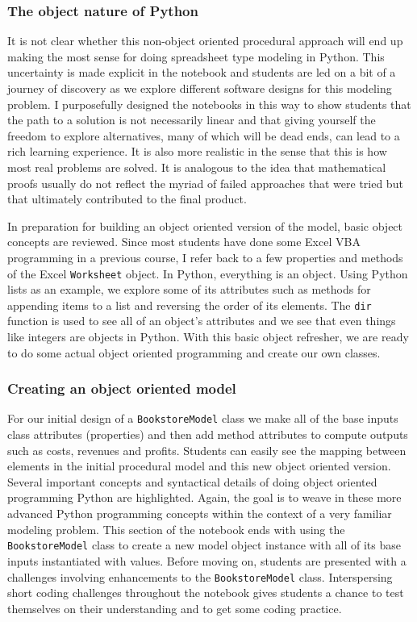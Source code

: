 \documentclass[ited,blindrev]{informs3}              %
\newcommand{\code}[1]{\texttt{#1}}
\begin{document}
\subsubsection{The object nature of Python}

It is not clear whether this non-object oriented procedural approach will end up making the most sense for doing spreadsheet type modeling in Python. This uncertainty is made explicit in the notebook and students are led on a bit of a journey of discovery as we explore different software designs for this modeling problem. I purposefully designed the notebooks in this way to show students that the path to a solution is not necessarily linear and that giving yourself the freedom to explore alternatives, many of which will be dead ends, can lead to a rich learning experience. It is also more realistic in the sense that this is how most real problems are solved. It is analogous to the idea that mathematical proofs usually do not reflect the myriad of failed approaches that were tried but that ultimately contributed to the final product.

In preparation for building an object oriented version of the model, basic object concepts are reviewed. Since most students have done some Excel VBA programming in a previous course, I refer back to a few properties and methods of the Excel \code{Worksheet} object. In Python, everything is an object. Using Python lists as an example, we explore some of its attributes such as methods for appending items to a list and reversing the order of its elements. The \code{dir} function is used to see all of an object's attributes and we see that even things like integers are objects in Python. With this basic object refresher, we are ready to do some actual object oriented programming and create our own classes.

\subsubsection{Creating an object oriented model}

For our initial design of a \code{BookstoreModel} class we make all of the base inputs class attributes (properties) and then add method attributes to compute outputs such as costs, revenues and profits. Students can easily see the mapping between elements in the initial procedural model and this new object oriented version. Several important concepts and syntactical details of doing object oriented programming Python are highlighted. Again, the goal is to weave in these more advanced Python programming concepts within the context of a very familiar modeling problem. This section of the notebook ends with using the \code{BookstoreModel} class to create a new model object instance with all of its base inputs instantiated with values. Before moving on, students are presented with a challenges involving enhancements to the \code{BookstoreModel} class. Interspersing short coding challenges throughout the notebook gives students a chance to test themselves on their understanding and to get some coding practice.
\end{document}
